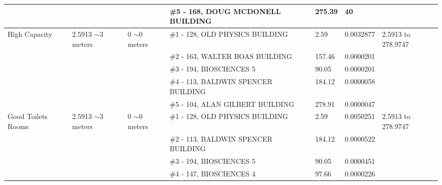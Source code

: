 \begin{table}[H]
{\begin{tabular}{|l|l|l|l|l|l|l|}
                   &                          &                                                 & \#5 - 168, DOUG MCDONELL BUILDING                     & 275.39        & 40              &                           \\ \hline
High Capacity      & 2.5913 $\sim$3 meters    & 0 $\sim$0  meters                               & \#1 - 128, OLD PHYSICS BUILDING                       & 2.59          & 0.0032877       & 2.5913 to 278.9747        \\ \hline
                   &                          &                                                 & \#2 - 163, WALTER BOAS BUILDING                       & 157.46        & 0.0000201       &                           \\ \hline
                   &                          &                                                 & \#3 - 194, BIOSCIENCES 5                              & 90.05         & 0.0000201       &                           \\ \hline
                   &                          &                                                 & \#4 - 113, BALDWIN SPENCER BUILDING                   & 184.12        & 0.0000058       &                           \\ \hline
                   &                          &                                                 & \#5 - 104, ALAN GILBERT BUILDING                      & 278.91        & 0.0000047       &                           \\ \hline
Good Toilets Rooms & 2.5913 $\sim$3 meters    & 0 $\sim$0  meters                               & \#1 - 128, OLD PHYSICS BUILDING                       & 2.59          & 0.0050251       & 2.5913 to 278.9747        \\ \hline
                   &                          &                                                 & \#2 - 113, BALDWIN SPENCER BUILDING                   & 184.12        & 0.0000522       &                           \\ \hline
                   &                          &                                                 & \#3 - 194, BIOSCIENCES 5                              & 90.05         & 0.0000451       &                           \\ \hline
                   &                          &                                                 & \#4 - 147, BIOSCIENCES 4                              & 97.66         & 0.0000226       &                           \\ \hline

\end{tabular}}
\end{table}
